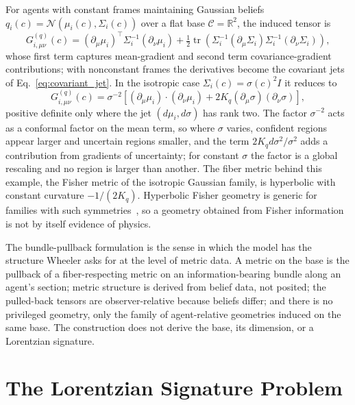 \documentclass[11pt]{article}
\begin{document}
For agents with constant frames maintaining Gaussian beliefs $q_i(c) = \mathcal{N}(\mu_i(c), \Sigma_i(c))$ over a flat base $\mathcal{C} = \mathbb{R}^2$, the induced tensor is
\begin{equation}
G^{(q)}_{i,\mu\nu}(c) = (\partial_\mu \mu_i)^\top \Sigma_i^{-1} (\partial_\nu \mu_i) + \tfrac{1}{2}\operatorname{tr}\left(\Sigma_i^{-1}(\partial_\mu \Sigma_i)\Sigma_i^{-1}(\partial_\nu \Sigma_i)\right),
\end{equation}
whose first term captures mean-gradient and second term covariance-gradient contributions; with nonconstant frames the derivatives become the covariant jets of Eq.~\eqref{eq:covariant_jet}. In the isotropic case $\Sigma_i(c) = \sigma(c)^2 I$ it reduces to
\begin{equation}
G^{(q)}_{i,\mu\nu}(c) = \sigma^{-2}\left[(\partial_\mu\mu_i)\cdot(\partial_\nu\mu_i) + 2K_q (\partial_\mu\sigma)(\partial_\nu\sigma)\right],
\end{equation}
positive definite only where the jet $(d\mu_i, d\sigma)$ has rank two. The factor $\sigma^{-2}$ acts as a conformal factor on the mean term, so where $\sigma$ varies, confident regions appear larger and uncertain regions smaller, and the term $2K_q d\sigma^2/\sigma^2$ adds a contribution from gradients of uncertainty; for constant $\sigma$ the factor is a global rescaling and no region is larger than another. The fiber metric behind this example, the Fisher metric of the isotropic Gaussian family, is hyperbolic with constant curvature $-1/(2K_q)$. Hyperbolic Fisher geometry is generic for families with such symmetries~\cite{ErdmengerGrosvenorJefferson2020}, so a geometry obtained from Fisher information is not by itself evidence of physics.

The bundle-pullback formulation is the sense in which the model has the structure Wheeler asks for at the level of metric data. A metric on the base is the pullback of a fiber-respecting metric on an information-bearing bundle along an agent's section; metric structure is derived from belief data, not posited; the pulled-back tensors are observer-relative because beliefs differ; and there is no privileged geometry, only the family of agent-relative geometries induced on the same base. The construction does not derive the base, its dimension, or a Lorentzian signature.

\section{The Lorentzian Signature Problem}\label{sec:signature_resolution}
\end{document}
